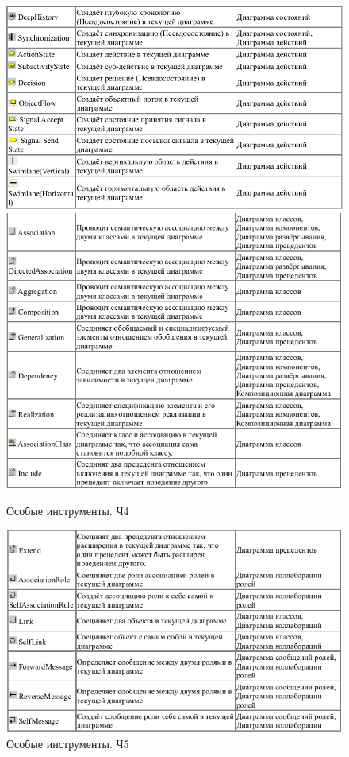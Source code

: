 \documentclass[a4paper,12pt]{extreport}
\begin{document}
\begin{figure}
	\centering
	\includegraphics[width=0.9\linewidth]{images/diffinstruments4}
	\includegraphics[width=0.9055\linewidth]{images/diffinstruments5}
	\caption{Особые инструменты. Ч4}
	\label{fig:diffinstruments4}
\end{figure}
\newpage
\begin{figure}[h!]
	\centering
	\includegraphics[width=0.9\linewidth]{images/diffinstruments6}
	\caption{Особые инструменты. Ч5}
	\label{fig:diffinstruments5}
\end{figure}
\end{document}
